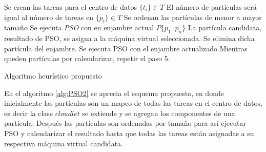 \begin{algorithm} 
	\begin{algorithmic}[1]
		\State Se crean las tareas para el centro de datos $ \{ t_i \} \in T $
		\State El número de partículas será igual al número de tareas en $ \{ p_i \} \in T $
		\State Se ordenan las partículas de menor a mayor tamaño
		\State Se ejecuta \textit{PSO} con en enjambre actual $ P\{p_1 .. p_n \} $
		\State La partícula candidata, resultado de PSO, se asigna a la máquina virtual seleccionada.
		\State Se elimina dicha partícula del enjambre.
		\State Se ejecuta PSO con el enjambre actualizado 
		\State Mientras queden partículas por calendarizar, repetir el paso 5.
		
	\end{algorithmic} 
	\caption{Algoritmo heurístico propuesto}
	\label{alg:PSO2}
\end{algorithm}


En el algoritmo \ref{alg:PSO2} se aprecia el esquema propuesto, en donde inicialmente las partículas son un mapeo de todas las tareas en el centro de datos, es decir la clase $cloudlet$ se extiende y se agregan los componentes de una partícula. Después las partículas son ordenadas por tamaño para así ejecutar PSO y calendarizar el resultado hasta que todas las tareas están asignadas a su respectiva máquina virtual candidata.
